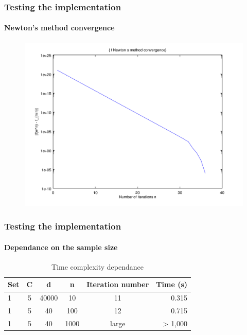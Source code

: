 \documentclass{beamer}
\begin{document}
\begin{frame}
\frametitle{Testing the implementation}
\framesubtitle{\textbf{Newton's method} convergence}


         \begin{figure}
         \centering
         \includegraphics[scale=0.4]{images/cvnewton4.png}
         \end{figure}

\end{frame}

\begin{frame}
\frametitle{Testing the implementation}
\framesubtitle{Dependance on the sample size}

                \begin{table}
                \centering
                \caption{Time complexity dependance}
                \begin{tabular}{| l | c | c | c | c | r |}
                \hline
                Set & C & d & n & Iteration number & Time (s) \\ \hline
                1 & 5 & 40000 & 10 & 11 & 0.315 \\ \hline
                1 & 5 & 40 & 100 & 12 & 0.715 \\ \hline
                1 & 5 & 40 & 1000 & large & > 1,000 \\ \hline
                \end{tabular}
                \end{table}

\end{frame}
\end{document}
